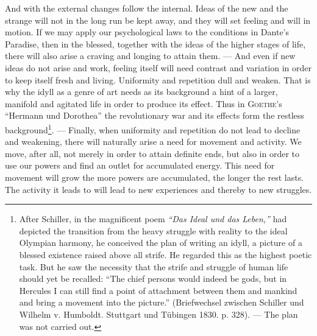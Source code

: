 \documentclass[12pt,a4paper,openany]{book}
\newcommand{\opage}[1]{\marginnote{\footnotesize\textit{[#1]}}}
\begin{document}
And with the external changes follow the internal. Ideas of the new and the strange will not in the long
run be kept away, and they will set feeling and will in motion. If we may apply our psychological laws to
the conditions in Dante's Paradise, then in the blessed, together with the ideas of the higher stages of
life, there will also arise a craving and longing to attain them. --- And even if new ideas do not arise
and work, feeling itself will need contrast and variation in order to keep itself fresh and living.
Uniformity and repetition dull and weaken. That is why the idyll as a genre of art needs as its
background a hint of a larger, manifold and agitated life in order to produce its effect. Thus in
\textsc{Goethe}'s ``Hermann und Dorothea'' the revolutionary war and its effects form the restless
background\footnote[1]{After Schiller, in the magnificent poem \textit{``Das Ideal und das Leben,''} had
depicted the transition from the heavy struggle with reality to the ideal Olympian harmony, he conceived
the plan of writing an idyll, a picture of a blessed existence raised above all strife. He regarded this as
the highest poetic task. But he saw the necessity that the strife and struggle of human life should yet be
recalled: ``The chief persons would indeed be gods, but in Hercules I can still find a point of attachment
between them and mankind and bring a movement into the picture.'' (Briefwechsel zwischen Schiller und
Wilhelm v. Humboldt. Stuttgart und Tübingen 1830. p. 328). --- The plan was not carried out.}. ---
Finally, when
\opage{143}uniformity and repetition do not lead to decline and weakening, there will naturally arise a need for
movement and activity. We move, after all, not merely in order to attain definite ends, but also in order
to use our powers and find an outlet for accumulated energy. This need for movement will grow the more
powers are accumulated, the longer the rest lasts. The activity it leads to will lead to new experiences
and thereby to new struggles.
\end{document}
